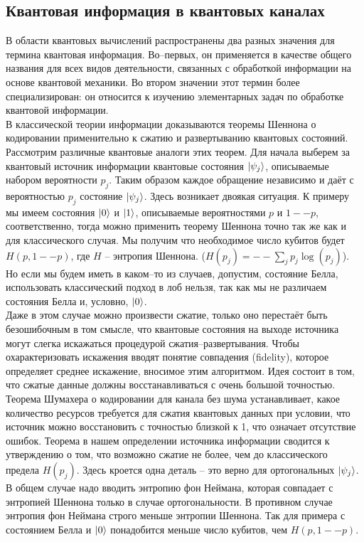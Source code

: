 \documentclass[12pt,a4paper]{article}
\begin{document}
	\subsection{Квантовая информация в квантовых каналах}
	В области квантовых вычислений распространены два разных значения для термина квантовая информация. Во--первых, он применяется в качестве общего названия для всех видов деятельности, связанных с обработкой информации на основе квантовой механики. Во втором значении этот термин более специализирован: он относится к изучению элементарных задач по обработке квантовой информации\cite{1}.\\
	\indent В классической теории информации доказываются теоремы Шеннона о кодировании применительно к сжатию и развертыванию квантовых состояний. Рассмотрим различные квантовые аналоги этих теорем. Для начала выберем за квантовый источник информации квантовые состояния $\ket{\psi_{j}}$, описываемые набором вероятности $p_{j}$. Таким образом каждое обращение независимо и даёт с вероятностью $p_{j}$ состояние  $\ket{\psi_{j}}$. Здесь возникает двоякая ситуация. К примеру мы имеем состояния $\ket{0}$ и $\ket{1}$, описываемые вероятностями $p$ и $1--p$, соответственно, тогда можно применить теорему Шеннона точно так же как и для классического случая. Мы получим что необходимое число кубитов будет $H(p,1--p)$, где $H$ -- энтропия Шеннона. ($H(p_{j})=--\sum_{j}p_{j}\log(p_{j})$). Но если мы будем иметь в каком--то из случаев, допустим, состояние Белла, использовать классический подход в лоб нельзя, так как мы не различаем состояния Белла и, условно,  $\ket{0}$. \\
	\indent Даже в этом случае можно произвести сжатие, только оно перестаёт быть безошибочным в том смысле, что квантовые состояния на выходе источника могут слегка искажаться процедурой сжатия--развертывания. Чтобы охарактеризовать искажения вводят понятие совпадения (fidelity), которое определяет среднее искажение, вносимое этим алгоритмом. Идея состоит в том, что сжатые данные должны восстанавливаться с очень большой точностью.\\
	\indent Теорема Шумахера о кодировании для канала без шума устанавливает, какое количество ресурсов требуется для сжатия квантовых данных при условии, что источник можно восстановить с точностью близкой к 1, что означает отсутствие ошибок. Теорема в нашем определении источника информации сводится к утверждению о том, что возможно сжатие не более, чем до классического предела $H(p_{j})$. Здесь кроется одна деталь -- это верно для ортогональных  $\ket{\psi_{j}}$. В общем случае надо вводить энтропию фон Неймана, которая совпадает с энтропией Шеннона только в случае ортогональности. В противном случае энтропия фон Неймана строго меньше энтропии Шеннона. Так для примера с состоянием Белла и $\ket{0}$ понадобится меньше число кубитов, чем  $H(p,1--p)$.
\end{document}
